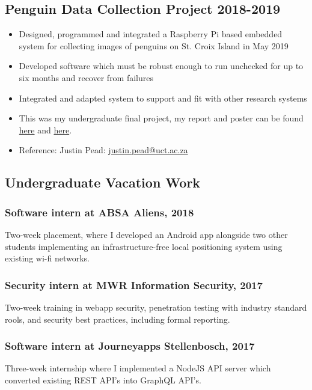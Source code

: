 \documentclass[10pt,a4paper,notitlepage]{article}
\begin{document}
\subsection*{Penguin Data Collection Project 2018-2019}
\begin{itemize}
	\setlength\itemsep{0.02em}
    \item Designed, programmed and integrated a Raspberry Pi based embedded system for collecting images of penguins on St. Croix Island in May 2019
    \item Developed software which must be robust enough to run unchecked for up to six months and recover from failures
    \item Integrated and adapted system to support and fit with other research systems
    \item This was my undergraduate final project, my report and poster can be found \href{https://awful.cloud/upl/thesis.pdf}{here} and \href{https://awful.cloud/upl/poster.pdf}{here}.
    \item Reference: Justin Pead: \href{mailto:justin.pead@uct.ac.za}{justin.pead@uct.ac.za}
\end{itemize}

\subsection*{Undergraduate Vacation Work}
\subsubsection*{\textbf{Software intern at ABSA Aliens, 2018}}
Two-week placement, where I developed an Android app alongside two other students implementing an
infrastructure-free local positioning system using existing wi-fi networks. 

\subsubsection*{\textbf{Security intern at MWR Information Security, 2017}}
Two-week training in webapp security, penetration testing with industry standard rools, and security
best practices, including formal reporting.

\subsubsection*{\textbf{Software intern at Journeyapps Stellenbosch, 2017}}
Three-week internship where I implemented a NodeJS API server which converted existing REST API's
into GraphQL API's.
\end{document}
